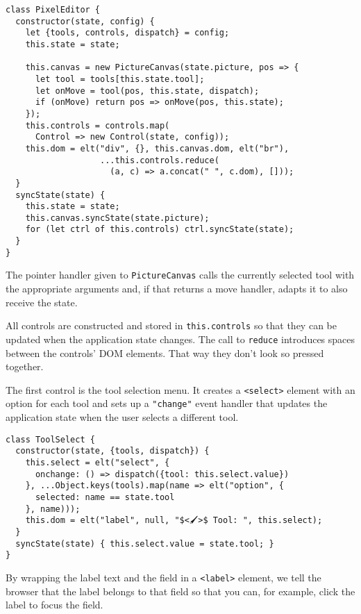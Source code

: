 \begin{lstlisting}
class PixelEditor {
  constructor(state, config) {
    let {tools, controls, dispatch} = config;
    this.state = state;

    this.canvas = new PictureCanvas(state.picture, pos => {
      let tool = tools[this.state.tool];
      let onMove = tool(pos, this.state, dispatch);
      if (onMove) return pos => onMove(pos, this.state);
    });
    this.controls = controls.map(
      Control => new Control(state, config));
    this.dom = elt("div", {}, this.canvas.dom, elt("br"),
                   ...this.controls.reduce(
                     (a, c) => a.concat(" ", c.dom), []));
  }
  syncState(state) {
    this.state = state;
    this.canvas.syncState(state.picture);
    for (let ctrl of this.controls) ctrl.syncState(state);
  }
}
\end{lstlisting}
\noindent

The pointer handler given to \lstinline`PictureCanvas` calls the currently selected tool with the appropriate arguments and, if that returns a move handler, adapts it to also receive the state.

All controls are constructed and stored in \lstinline`this.controls` so that they can be updated when the application state changes. The call to \lstinline`reduce` introduces spaces between the controls' DOM elements. That way they don't look so pressed together.

The first control is the tool selection menu. It creates a \lstinline`<select>` element with an option for each tool and sets up a \lstinline`"change"` event handler that updates the application state when the user selects a different tool.

\begin{lstlisting}
class ToolSelect {
  constructor(state, {tools, dispatch}) {
    this.select = elt("select", {
      onchange: () => dispatch({tool: this.select.value})
    }, ...Object.keys(tools).map(name => elt("option", {
      selected: name == state.tool
    }, name)));
    this.dom = elt("label", null, "$<🖌>$ Tool: ", this.select);
  }
  syncState(state) { this.select.value = state.tool; }
}
\end{lstlisting}
\noindent{}

By wrapping the label text and the field in a \lstinline`<label>` element, we tell the browser that the label belongs to that field so that you can, for example, click the label to focus the field.


